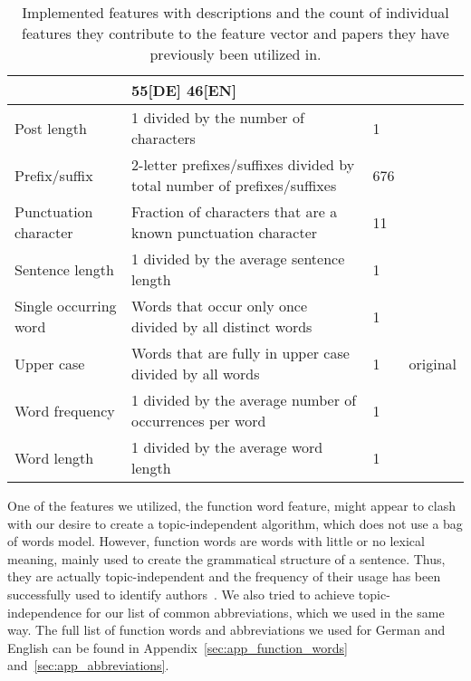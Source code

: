 \begin{savenotes}
\begin{table}[ht!]
\begin{center}
\begin{tabular}{p{2.6cm}|p{6cm}|p{1.2cm}|p{1.2cm}}
                                                                                                        & 55[DE] 46[EN]     & \cite{madigan2005author}\\ \hline
    Post length              & 1 divided by the number of characters                                     & 1                 & \cite{narayanan2012feasibility}\\ \hline
    Prefix/suffix            & 2-letter prefixes/suffixes divided by total number of prefixes/suffixes   & 676               & \cite{madigan2005author}\\ \hline
    Punctuation character   & Fraction of characters that are a known punctuation character             & 11                & \cite{madigan2005author} \cite{narayanan2012feasibility}\\ \hline
    Sentence length          & 1 divided by the average sentence length                                  & 1                 & \cite{de2001mining}\\ \hline
    Single occurring word    & Words that occur only once divided by all distinct words                  & 1                 & \cite{madigan2005author} \cite{narayanan2012feasibility}\\ \hline
    Upper case           & Words that are fully in upper case divided by all words                   & 1                 & original\\ \hline
    Word frequency           & 1 divided by the average number of occurrences per word                   & 1                 & \cite{madigan2005author} \cite{narayanan2012feasibility}\\ \hline
    Word length              & 1 divided by the average word length                                      & 1                 & \cite{argamon2003style} \cite{narayanan2012feasibility}\\
    \end{tabular}
    \end{center}
    \caption{Implemented features with descriptions and the count of individual features they contribute to the feature vector and papers they have previously been utilized in.}
    \label{tab:featureTable}
\end{table}


One of the features we utilized, the function word feature, might appear to clash with our desire to create a topic-independent algorithm, which does not use a bag of words model.
However, function words are words with little or no lexical meaning, mainly used to create the grammatical structure of a sentence.
Thus, they are actually topic-independent and the frequency of their usage has been successfully used to identify authors~\cite{mosteller1962applied}.
We also tried to achieve topic-independence for our list of common abbreviations, which we used in the same way.
The full list of function words and abbreviations we used for German and English can be found in Appendix~\ref{sec:app_function_words} and~\ref{sec:app_abbreviations}.

\end{savenotes}

